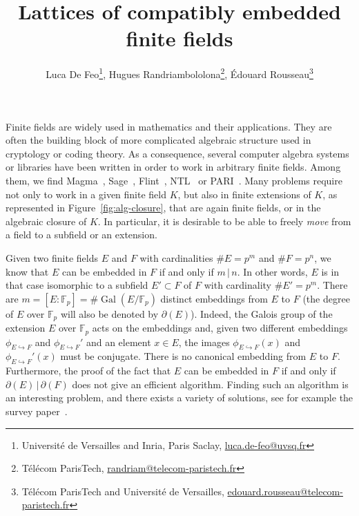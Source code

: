\documentclass[12pt]{article}
\title{Lattices of compatibly embedded finite fields}
\author{Luca De Feo\footnote{
    Université de Versailles and Inria, Paris Saclay,
    \url{luca.de-feo@uvsq.fr}
  },
  Hugues Randriambololona\footnote{
    Télécom ParisTech,
    \url{randriam@telecom-paristech.fr}
  },
  Édouard Rousseau\footnote{
    Télécom ParisTech and Université de Versailles,
    \url{edouard.rousseau@telecom-paristech.fr}
  }
}
\DeclareMathOperator{\Gal}{Gal}
\newcommand{\dE}{\partial(E)}
\newcommand{\dF}{\partial(F)}
\newcommand{\embed}[2]{\phi_{#1\hookrightarrow#2}}
\begin{document}
\maketitle

Finite fields are widely used in mathematics and their applications. They are
often the building block of more complicated algebraic structure used in
cryptology or coding theory. As a
consequence, several computer algebra systems or libraries have been written in
order to work in arbitrary finite fields. Among them, we find
Magma~\cite{Magma}, Sage~\cite{Sagemath}, Flint~\cite{Flint}, NTL~\cite{NTL} or
PARI~\cite{Pari}. Many problems require not only to work in a given finite field
$K$, but also in finite extensions of $K$, as represented in
Figure~\ref{fig:alg-closure}, that are again finite fields, or in
the algebraic closure of $K$. In particular, it is desirable to be able to
freely \emph{move} from a field to a subfield or an extension.

Given two finite fields $E$ and $F$ with cardinalities $\#E=p^{m}$ and
$\#F=p^{n}$, we know that $E$ can be embedded in $F$ if and only if $m\,|\,n$.
In other words, $E$ is in that case isomorphic to a subfield $E'\subset F$ of
$F$ with
cardinality $\#E'=p^{m}$. There are
$m=[E:\mathbb{F}_p]=\#\Gal(E/\mathbb{F}_p)$ distinct embeddings from $E$ to
$F$ (the degree of $E$ over $\mathbb{F}_p$ will also be denoted by
$\partial(E)$). Indeed, the Galois group of the extension $E$ over
$\mathbb{F}_p$ acts
on the embeddings and, given two different embeddings $\embed{E}{F}$ and
$\embed{E}{F}'$ and an element $x\in E$, the images $\embed{E}{F}(x)$ and
$\embed{E}{F}'(x)$ must be conjugate. There is no canonical
embedding from $E$ to $F$. Furthermore, the proof of the fact that $E$ can be
embedded in $F$ if and only if $\dE\,|\,\dF$ does not give an efficient
algorithm. Finding such an algorithm is an interesting problem, and there exists
a variety of solutions, see for example the survey paper~\cite{BDDFS17}.
\end{document}
